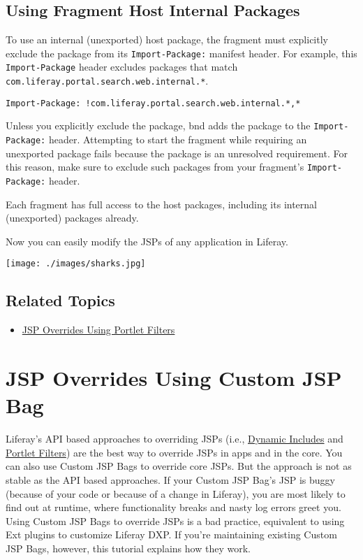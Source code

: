 \section{Using Fragment Host Internal
Packages}\label{using-fragment-host-internal-packages}

To use an internal (unexported) host package, the fragment must
explicitly exclude the package from its \texttt{Import-Package:}
manifest header. For example, this \texttt{Import-Package} header
excludes packages that match
\texttt{com.liferay.portal.search.web.internal.*}.

\begin{verbatim}
Import-Package: !com.liferay.portal.search.web.internal.*,*
\end{verbatim}

Unless you explicitly exclude the package, bnd adds the package to the
\texttt{Import-Package:} header. Attempting to start the fragment while
requiring an unexported package fails because the package is an
unresolved requirement. For this reason, make sure to exclude such
packages from your fragment's \texttt{Import-Package:} header.

Each fragment has full access to the host packages, including its
internal (unexported) packages already.

Now you can easily modify the JSPs of any application in Liferay.

\texttt{[image: ./images/sharks.jpg]}

\section{Related Topics}\label{related-topics-17}

\begin{itemize}
\tightlist
\item
  \href{/docs/7-2/customization/-/knowledge_base/c/jsp-overrides-using-portlet-filters}{JSP
  Overrides Using Portlet Filters}
\end{itemize}

\chapter{JSP Overrides Using Custom JSP
Bag}\label{jsp-overrides-using-custom-jsp-bag}

Liferay's API based approaches to overriding JSPs (i.e.,
\href{/docs/7-2/customization/-/knowledge_base/c/customizing-jsps-with-dynamic-includes}{Dynamic
Includes} and
\href{/docs/7-2/customization/-/knowledge_base/c/jsp-overrides-using-portlet-filters}{Portlet
Filters}) are the best way to override JSPs in apps and in the core. You
can also use Custom JSP Bags to override core JSPs. But the approach is
not as stable as the API based approaches. If your Custom JSP Bag's JSP
is buggy (because of your code or because of a change in Liferay), you
are most likely to find out at runtime, where functionality breaks and
nasty log errors greet you. Using Custom JSP Bags to override JSPs is a
bad practice, equivalent to using Ext plugins to customize Liferay DXP.
If you're maintaining existing Custom JSP Bags, however, this tutorial
explains how they work.

